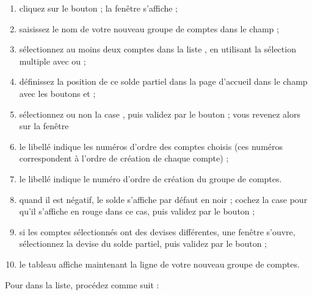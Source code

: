 \begin{enumerate}
	\item cliquez sur le bouton  ; la fenêtre  s'affiche ;
	\item saisissez le nom de votre nouveau groupe de comptes dans le champ  ;
	\item sélectionnez au moins deux comptes dans la liste , en utilisant la sélection multiple avec  ou   ; 
	\item définissez la position de ce solde partiel dans la page d'accueil dans le champ  avec les boutons \menu{+} et \menu{-} ;
	\item sélectionnez ou non la case , puis validez par le bouton  ; vous revenez alors sur la fenêtre 
 	\item le libellé  indique les numéros d'ordre des comptes choisis (ces numéros correspondent à l'ordre de création de chaque compte) ;
	\item le libellé  indique le numéro d'ordre de création du groupe de comptes.
	\item quand il est négatif, le solde s'affiche par défaut en noir{\couleur} ; cochez la case  pour qu'il s'affiche en rouge{\couleur} dans ce cas,  puis validez par le bouton  ;
	\item si les comptes sélectionnés ont des devises différentes, une fenêtre s'ouvre, sélectionnez la devise du solde partiel, puis validez par le bouton  ;
	\item le tableau  affiche maintenant la ligne de votre nouveau groupe de comptes. 
\end{enumerate}

Pour  dans la liste, procédez comme suit :

